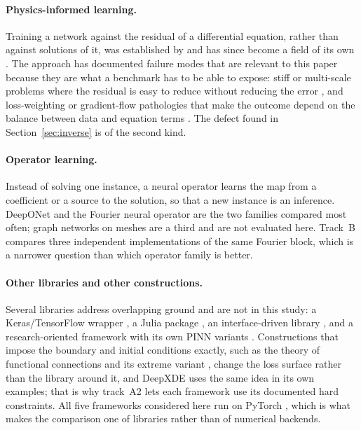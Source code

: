 \documentclass[11pt]{article}
\begin{document}
\paragraph{Physics-informed learning.} Training a network against the residual of a differential
equation, rather than against solutions of it, was established by \citet{raissi2019pinn} and has since
become a field of its own \citep{karniadakis2021piml}. The approach has documented failure modes that
are relevant to this paper because they are what a benchmark has to be able to expose: stiff or
multi-scale problems where the residual is easy to reduce without reducing the error
\citep{krishnapriyan2021failure}, and loss-weighting or gradient-flow pathologies that make the
outcome depend on the balance between data and equation terms \citep{wang2021gradient}. The defect
found in Section~\ref{sec:inverse} is of the second kind.

\paragraph{Operator learning.} Instead of solving one instance, a neural operator learns the map from
a coefficient or a source to the solution, so that a new instance is an inference. DeepONet
\citep{lu2021deeponet} and the Fourier neural operator \citep{li2021fno} are the two families compared
most often; graph networks on meshes \citep{pfaff2021meshgraphnets} are a third and are not evaluated
here. Track~B compares three independent implementations of the same Fourier block, which is a
narrower question than which operator family is better.

\paragraph{Other libraries and other constructions.} Several libraries address overlapping ground and
are not in this study: a Keras/TensorFlow wrapper \citep{haghighat2021sciann}, a Julia package
\citep{zubov2021neuralpde}, an interface-driven library \citep{peng2021idrlnet}, and a
research-oriented framework with its own PINN variants \citep{coscia2023pina}. Constructions that
impose the boundary and initial conditions exactly, such as the theory of functional connections and
its extreme variant \citep{schiassi2021xtfc}, change the loss surface rather than the library around
it, and DeepXDE uses the same idea in its own examples; that is why track~A2 lets each framework use
its documented hard constraints. All five frameworks considered here run on PyTorch
\citep{ansel2024pytorch2}, which is what makes the comparison one of libraries rather than of
numerical backends.
\end{document}
